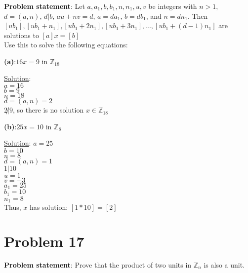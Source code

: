 \documentclass{article} %
\begin{document}
\textbf{Problem statement}: Let $a, a_1, b, b_1, n, n_1, u, v$ be integers with $n > 1$, $d = (a,n)$, $d|b$, $au + nv = d$, $a = da_1$, $b = db_1$, and $n = dn_1$.  Then $[ub_1], [ub_1 + n_1], [ub_1 + 2n_1], [ub_1 + 3n_1], ..., [ub_1 + (d-1)n_1]$ are solutions to $[a]x = [b]$
\\ \hfill \break
Use this to solve the following equations:
\\

\begin{addmargin}[1em]{0em}
\textbf{(a)}:$16x = 9$ in $\mathbb{Z}_{18}$
\begin{addmargin}[1em]{0em}
\underline{Solution}: \\
$a = 16$ \\
$b = 9$ \\
$n = 18$ \\
$d = (a,n) = 2$ \\
$2 \not| 9$, so there is no solution $x \in \mathbb{Z}_{18}$
\begin{addmargin}[1em]{0em}
\end{addmargin}
\end{addmargin}

\textbf{(b)}:$25x = 10$ in $\mathbb{Z}_{8}$
\begin{addmargin}[1em]{0em}
\underline{Solution}: 
$a = 25$ \\
$b = 10$ \\
$n = 8$ \\
$d = (a,n) = 1$ \\
$1|10$ \checkmark \\
$u = 1$ \\
$v = -3$ \\
$a_1 = 25$ \\
$b_1 = 10$ \\
$n_1 = 8$\\
Thus, $x$ has solution: $[1 * 10] = [2]$
\begin{addmargin}[1em]{0em}
\end{addmargin}
\end{addmargin}
\end{addmargin}

\newpage

\section*{Problem 17}

\textbf{Problem statement}: Prove that the product of two units in $\mathbb{Z}_n$ is also a unit.
\\
\end{document}
